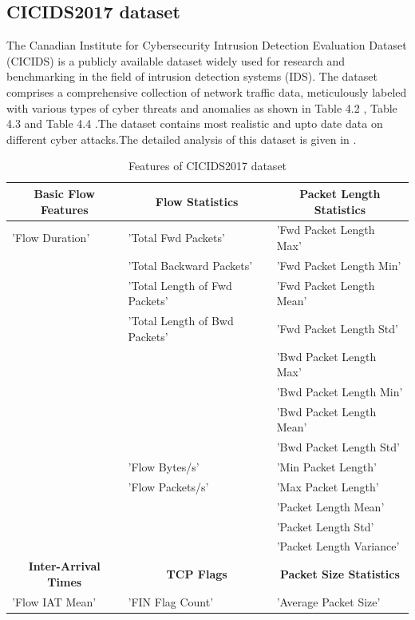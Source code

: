\subsection{CICIDS2017 dataset}
The Canadian Institute for Cybersecurity Intrusion Detection Evaluation Dataset (CICIDS) is a publicly available dataset widely used for research and benchmarking in the field of intrusion detection systems (IDS). The dataset comprises a comprehensive collection of network traffic data, meticulously labeled with various types of cyber threats and anomalies as shown in Table 4.2 , Table 4.3 and Table 4.4 .The dataset contains most realistic and upto date data on different cyber attacks.The detailed analysis of this dataset is given in \cite{sharafaldin2019detailed}.

\begin{table}[htbp]
\centering
\caption{Features of CICIDS2017 dataset}
\begin{tabular}{|p{4cm}|p{6cm}|p{4cm}|}
\hline
\multicolumn{1}{|c|}{\textbf{Basic Flow Features}} & \multicolumn{1}{c|}{\textbf{Flow Statistics}} & \multicolumn{1}{c|}{\textbf{Packet Length Statistics}} \\
\hline
'Flow Duration' & 'Total Fwd Packets' & 'Fwd Packet Length Max' \\
 & 'Total Backward Packets' & 'Fwd Packet Length Min' \\
 & 'Total Length of Fwd Packets' & 'Fwd Packet Length Mean' \\
 & 'Total Length of Bwd Packets' & 'Fwd Packet Length Std' \\
 &  & 'Bwd Packet Length Max' \\
 &  & 'Bwd Packet Length Min' \\
 &  & 'Bwd Packet Length Mean' \\
 &  & 'Bwd Packet Length Std' \\
 & 'Flow Bytes/s' & 'Min Packet Length' \\
 & 'Flow Packets/s' & 'Max Packet Length' \\
 &  & 'Packet Length Mean' \\
 &  & 'Packet Length Std' \\
 &  & 'Packet Length Variance' \\
\hline
\multicolumn{1}{|c|}{\textbf{Inter-Arrival Times}} & \multicolumn{1}{c|}{\textbf{TCP Flags}} & \multicolumn{1}{c|}{\textbf{Packet Size Statistics}} \\
\hline
'Flow IAT Mean' & 'FIN Flag Count' & 'Average Packet Size' \\

\end{tabular}
\end{table}
